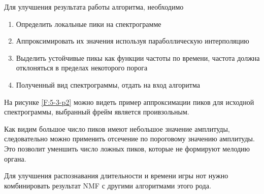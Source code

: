 \documentclass[oneside, final, 12pt]{extarticle}
\begin{document}
Для улучшения результата работы алгоритма, необходимо
\begin{enumerate}
  \item Определить локальные пики на спектрограмме
  \item Аппроксимировать их значения используя параболлическую интерполяцию
  \item Выделить устойчивые пикы как функции частоты по времени,
    частота должна отклоняться в пределах некоторого порога
  \item Полученный вид спектрограммы, отдать на вход алгоритма
\end{enumerate}

На рисунке \ref{F:5-3-p2} можно видеть пример аппроксимации пиков
для исходной спектрограммы, выбранный фрейм является проивзольным.

Как видим большое число пиков имеют небольшое значение амплитуды, следовательно
можно применить отсечение по пороговому значению амплитуды. Это позволит
уменшить число ложных пиков, которые не формируют мелодию органа.

Для улучшения распознавания длительности и времени игры нот
нужно комбинировать результат NMF с другими алгоритмами этого рода.

\cleardoublepage



\cleardoublepage
\end{document}
